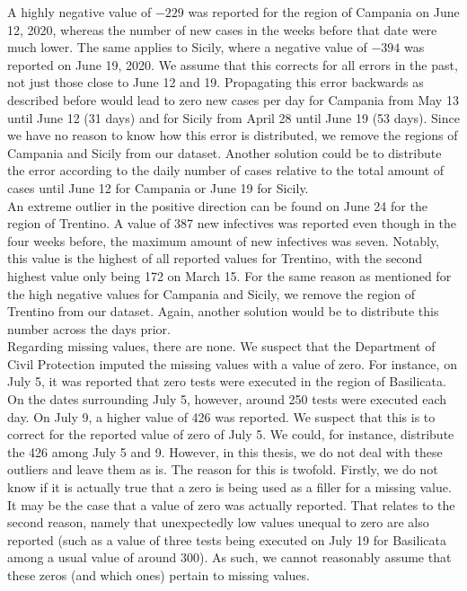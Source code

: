 \documentclass[12pt]{article}
\begin{document}
	A highly negative value of $-229$ was reported for the region of Campania on June 12, 2020, whereas the number of new cases in the weeks before that date were much lower. The same applies to Sicily, where a negative value of $-394$ was reported on June 19, 2020. We assume that this corrects for all errors in the past, not just those close to June 12 and 19. Propagating this error backwards as described before would lead to zero new cases per day for Campania from May 13 until June 12 (31 days) and for Sicily from April 28 until June 19 (53 days). Since we have no reason to know how this error is distributed, we remove the regions of Campania and Sicily from our dataset. Another solution could be to distribute the error according to the daily number of cases relative to the total amount of cases until June 12 for Campania or June 19 for Sicily.
	\\
	
	An extreme outlier in the positive direction can be found on June 24 for the region of Trentino. A value of 387 new infectives was reported even though in the four weeks before, the maximum amount of new infectives was seven. Notably, this value is the highest of all reported values for Trentino, with the second highest value only being 172 on March 15. For the same reason as mentioned for the high negative values for Campania and Sicily, we remove the region of Trentino from our dataset. Again, another solution would be to distribute this number across the days prior.
	\\
	
	\newpage
	Regarding missing values, there are none. We suspect that the Department of Civil Protection imputed the missing values with a value of zero. For instance, on July 5, it was reported that zero tests were executed in the region of Basilicata. On the dates surrounding July 5, however, around 250 tests were executed each day. On July 9, a higher value of 426 was reported. We suspect that this is to correct for the reported value of zero of July 5. We could, for instance, distribute the 426 among July 5 and 9. However, in this thesis, we do not deal with these outliers and leave them as is. The reason for this is twofold. Firstly, we do not know if it is actually true that a zero is being used as a filler for a missing value. It may be the case that a value of zero was actually reported. That relates to the second reason, namely that unexpectedly low values unequal to zero are also reported (such as a value of three tests being executed on July 19 for Basilicata among a usual value of around 300). As such, we cannot reasonably assume that these zeros (and which ones) pertain to missing values.
	
\end{document}
